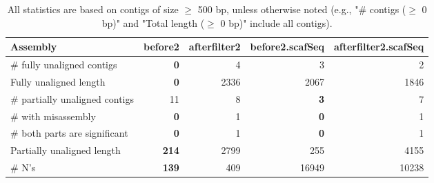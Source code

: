 \documentclass[12pt,a4paper]{article}
\begin{document}
\begin{table}[ht]
\begin{center}
\caption{All statistics are based on contigs of size $\geq$ 500 bp, unless otherwise noted (e.g., "\# contigs ($\geq$ 0 bp)" and "Total length ($\geq$ 0 bp)" include all contigs).}
\begin{tabular}{|l*{4}{|r}|}
\hline
Assembly & before2 & afterfilter2 & before2.scafSeq & afterfilter2.scafSeq \\ \hline
\# fully unaligned contigs & {\bf 0} & 4 & 3 & 2 \\ \hline
Fully unaligned length & {\bf 0} & 2336 & 2067 & 1846 \\ \hline
\# partially unaligned contigs & 11 & 8 & {\bf 3} & 7 \\ \hline
\hspace{5mm}\# with misassembly & {\bf 0} & 1 & {\bf 0} & 1 \\ \hline
\hspace{5mm}\# both parts are significant & {\bf 0} & 1 & {\bf 0} & 1 \\ \hline
Partially unaligned length & {\bf 214} & 2799 & 255 & 4155 \\ \hline
\# N's & {\bf 139} & 409 & 16949 & 10238 \\ \hline
\end{tabular}
\end{center}
\end{table}
\end{document}
